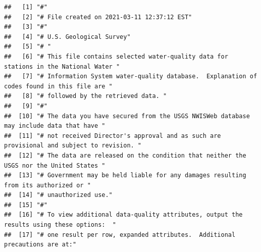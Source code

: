 \documentclass[
]{book}
\begin{document}
\begin{verbatim}
##   [1] "#"                                                                                                                                            
##   [2] "# File created on 2021-03-11 12:37:12 EST"                                                                                                    
##   [3] "#"                                                                                                                                            
##   [4] "# U.S. Geological Survey"                                                                                                                     
##   [5] "# "                                                                                                                                           
##   [6] "# This file contains selected water-quality data for stations in the National Water "                                                         
##   [7] "# Information System water-quality database.  Explanation of codes found in this file are "                                                   
##   [8] "# followed by the retrieved data. "                                                                                                           
##   [9] "#"                                                                                                                                            
##  [10] "# The data you have secured from the USGS NWISWeb database may include data that have "                                                       
##  [11] "# not received Director's approval and as such are provisional and subject to revision. "                                                     
##  [12] "# The data are released on the condition that neither the USGS nor the United States "                                                        
##  [13] "# Government may be held liable for any damages resulting from its authorized or "                                                            
##  [14] "# unauthorized use."                                                                                                                          
##  [15] "#"                                                                                                                                            
##  [16] "# To view additional data-quality attributes, output the results using these options:  "                                                      
##  [17] "# one result per row, expanded attributes.  Additional precautions are at:"                                                                   

\end{verbatim}
\end{document}
